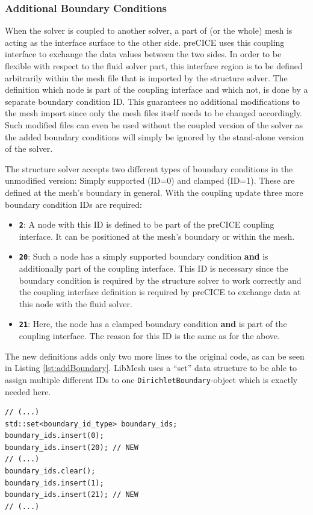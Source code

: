   \subsubsection{Additional Boundary Conditions}\label{sec:Coupl-Impl-BCs}
   When the solver is coupled to another solver, a part of (or the whole) mesh is acting as the interface surface to the other side. preCICE uses this coupling interface to exchange the data values between the two sides. In order to be flexible with respect to the fluid solver part, this interface region is to be defined arbitrarily within the mesh file that is imported by the structure solver. The definition which node is part of the coupling interface and which not, is done by a separate boundary condition ID. This guarantees no additional modifications to the mesh import since only the mesh files itself needs to be changed accordingly. Such modified files can even be used without the coupled version of the solver as the added boundary conditions will simply be ignored by the stand-alone version of the solver.
   
   The structure solver accepts two different types of boundary conditions in the unmodified version: Simply supported (ID=0) and clamped (ID=1). These are defined at the mesh's boundary in general. With the coupling update three more boundary condition IDs are required:
   \begin{itemize}
  	\item \textbf{\texttt{2}}: A node with this ID is defined to be part of the preCICE coupling interface. It can be positioned at the mesh's boundary or within the mesh.
  	\item \textbf{\texttt{20}}: Such a node has a simply supported boundary condition \textbf{and} is additionally part of the coupling interface. This ID is necessary since the boundary condition is required by the structure solver to work correctly and the coupling interface definition is required by preCICE to exchange data at this node with the fluid solver.
  	\item \textbf{\texttt{21}}: Here, the node has a clamped boundary condition \textbf{and} is part of the coupling interface. The reason for this ID is the same as for the above.
   \end{itemize}
   
   The new definitions adds only two more lines to the original code, as can be seen in Listing \ref{lst:addBoundary}. LibMesh uses a ``set'' data structure to be able to assign multiple different IDs to one \texttt{DirichletBoundary}-object which is exactly needed here.
\begin{lstlisting}[caption=Additional boundary condition IDs,label=lst:addBoundary,keepspaces=true]
// (...)
std::set<boundary_id_type> boundary_ids;
boundary_ids.insert(0);
boundary_ids.insert(20); // NEW
// (...)
boundary_ids.clear();
boundary_ids.insert(1);
boundary_ids.insert(21); // NEW
// (...)
\end{lstlisting}
  	
